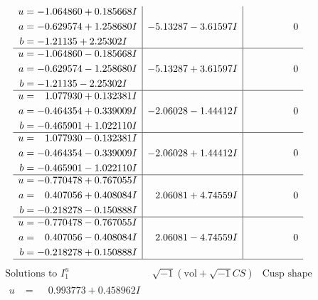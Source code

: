 \documentclass[1p]{elsarticle_modified}
\theoremstyle{definition}
\newcommand{\I}{\sqrt{-1}}
\begin{document}
$$\begin{array}{c|c|c}
\begin{aligned}
u &= -1.064860 + 0.185668 I \\
a &= -0.629574 + 1.258680 I \\
b &= -1.21135 + 2.25302 I\end{aligned}
 & -5.13287 - 3.61597 I & \phantom{-0.000000 } 0 \\ \hline\begin{aligned}
u &= -1.064860 - 0.185668 I \\
a &= -0.629574 - 1.258680 I \\
b &= -1.21135 - 2.25302 I\end{aligned}
 & -5.13287 + 3.61597 I & \phantom{-0.000000 } 0 \\ \hline\begin{aligned}
u &= \phantom{-}1.077930 + 0.132381 I \\
a &= -0.464354 + 0.339009 I \\
b &= -0.465901 + 1.022110 I\end{aligned}
 & -2.06028 - 1.44412 I & \phantom{-0.000000 } 0 \\ \hline\begin{aligned}
u &= \phantom{-}1.077930 - 0.132381 I \\
a &= -0.464354 - 0.339009 I \\
b &= -0.465901 - 1.022110 I\end{aligned}
 & -2.06028 + 1.44412 I & \phantom{-0.000000 } 0 \\ \hline\begin{aligned}
u &= -0.770478 + 0.767055 I \\
a &= \phantom{-}0.407056 + 0.408084 I \\
b &= -0.218278 - 0.150888 I\end{aligned}
 & \phantom{-}2.06081 + 4.74559 I & \phantom{-0.000000 } 0 \\ \hline\begin{aligned}
u &= -0.770478 - 0.767055 I \\
a &= \phantom{-}0.407056 - 0.408084 I \\
b &= -0.218278 + 0.150888 I\end{aligned}
 & \phantom{-}2.06081 - 4.74559 I & \phantom{-0.000000 } 0\\
 \hline 
 \end{array}$$\newpage$$\begin{array}{c|c|c}  
\text{Solutions to }I^u_{1}& \I (\text{vol} + \sqrt{-1}CS) & \text{Cusp shape}\\
 \hline 
\begin{aligned}
u &= \phantom{-}0.993773 + 0.458962 I \\

\end{aligned}
\end{array}$$
\end{document}
